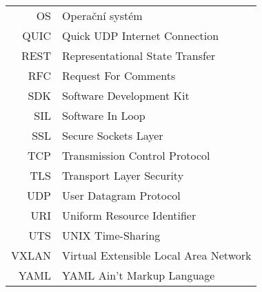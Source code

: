 \begin{tabular}{rl}
OS & Operační systém\\
QUIC & Quick UDP Internet Connection\\
REST & Representational State Transfer\\
RFC & Request For Comments\\
SDK & Software Development Kit\\
SIL & Software In Loop\\
SSL & Secure Sockets Layer\\
TCP & Transmission Control Protocol\\
TLS & Transport Layer Security\\
UDP & User Datagram Protocol\\
URI & Uniform Resource Identifier\\
UTS & UNIX Time-Sharing\\
VXLAN & Virtual Extensible Local Area Network\\
YAML & YAML Ain't Markup Language\\
\end{tabular}